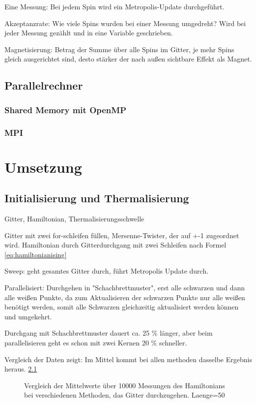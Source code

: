 \documentclass{scrreprt}
\begin{document}
	Eine Messung: Bei jedem Spin wird ein Metropolis-Update durchgeführt.
	
	Akzeptanzrate: Wie viele Spins wurden bei einer Messung umgedreht? Wird bei jeder Messung gezählt und in eine Variable geschrieben.
	
	Magnetisierung: Betrag der Summe über alle Spins im Gitter, je mehr Spins gleich ausgerichtet sind, desto stärker der nach außen sichtbare Effekt als Magnet.
	
	
	\section{Parallelrechner}
	\subsection{Shared Memory mit OpenMP}
	\subsection{MPI}
	
	
	\chapter{Umsetzung}
	\section{Initialisierung und Thermalisierung}
	Gitter, Hamiltonian, Thermalisierungsschwelle
	
	Gitter mit zwei for-schleifen füllen, Mersenne-Twister, der auf +-1 zugeordnet wird.
	Hamiltonian durch Gitterdurchgang mit zwei Schleifen nach Formel \ref{eq:hamiltonianising}
	
	Sweep: geht gesamtes Gitter durch, führt Metropolis Update durch.
	
	Parallelisiert: Durchgehen in "Schachbrettmuster", erst alle schwarzen und dann alle weißen Punkte, da zum Aktualisieren der schwarzen Punkte nur alle weißen benötigt werden, somit alle Schwarzen gleichzeitig aktualisiert werden können und umgekehrt.
	
	Durchgang mit Schachbrettmuster dauert ca. 25 \% länger, aber beim parallelisieren geht es schon mit zwei Kernen 20 \% schneller. 
	
	Vergleich der Daten zeigt: Im Mittel kommt bei allen methoden dasselbe Ergebnis heraus. \ref{fig:vergleichhamiltoniansweep}
	
	\begin{figure}[htbp]
	
	\label{fig:vergleichhamiltoniansweep}
		\caption{Vergleich der Mittelwerte über 10000 Messungen des Hamiltonians bei verschiedenen Methoden, das Gitter durchzugehen. Laenge=50}
	\end{figure}
	
\end{document}

